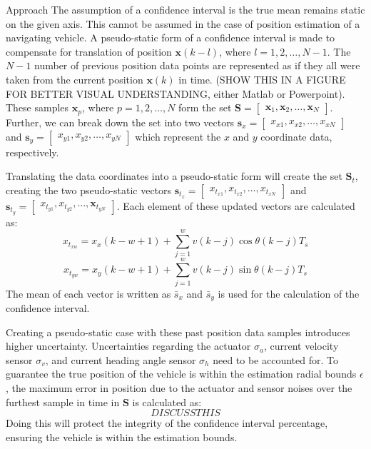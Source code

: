 \begin{section}{Approach}
The assumption of a confidence interval is the true mean remains static on the given axis. This cannot be assumed in the case of position estimation of a navigating vehicle. A pseudo-static form of a confidence interval is made to compensate for translation of position $\bm{x}(k-l)$, where $l=1,2,\dots,N-1$. The $N-1$ number of previous position data points are represented as if they all were taken from the current position $\bm{x}(k)$ in time. (SHOW THIS IN A FIGURE FOR BETTER VISUAL UNDERSTANDING, either Matlab or Powerpoint). These samples $\bm{x}_p$, where $p=1,2,\dots,N$ form the set $\mathcal{\bm{S}}=\begin{bmatrix}\bm{x}_1,\bm{x}_2,\dots,\bm{x}_N \end{bmatrix}$. Further, we can break down the set into two vectors $\bm{s}_x=\begin{bmatrix} x_{x1},x_{x2},\dots,x_{xN} \end{bmatrix}$ and $\bm{s}_y=\begin{bmatrix} x_{y1},x_{y2},\dots,x_{yN} \end{bmatrix}$ which represent the $x$ and $y$ coordinate data, respectively. 

Translating the data coordinates into a pseudo-static form will create the set $\mathcal{\bm{S}}_t$, creating the two pseudo-static vectors $\bm{s}_{t_x}=\begin{bmatrix} x_{t_{x1}},x_{t_{x2}},\dots,x_{t_{xN}} \end{bmatrix}$ and $\bm{s}_{t_y}=\begin{bmatrix} x_{t_{y1}},x_{t_{y2}},\dots,\bm{x}_{t_{yN}} \end{bmatrix}$. Each element of these updated vectors are calculated as:
    \begin{equation}
	x_{t_{xw}} = x_x(k-w+1)+\sum_{j=1}^w v(k-j)\cos{\theta(k-j)T_s}
	\end{equation}
	\begin{equation}
	x_{t_{yw}} = x_y(k-w+1)+\sum_{j=1}^w v(k-j)\sin{\theta(k-j)T_s}
	\end{equation}
The mean of each vector is written as $\bar{s}_x$ and $\bar{s}_y$ is used for the calculation of the confidence interval.

Creating a pseudo-static case with these past position data samples introduces higher uncertainty. Uncertainties regarding the actuator $\sigma_a$, current velocity sensor $\sigma_v$, and current heading angle sensor $\sigma_h$ need to be accounted for. To guarantee the true position of the vehicle is within the estimation radial bounds $\epsilon$, the maximum error in position due to the actuator and sensor noises over the furthest sample in time in $\mathcal{\bm{S}}$ is calculated as:
    \begin{equation}
	DISCUSS THIS
	\end{equation}
Doing this will protect the integrity of the confidence interval percentage, ensuring the vehicle is within the estimation bounds.



\end{section}
